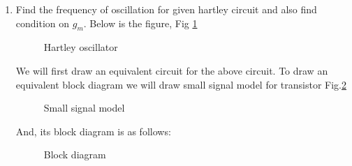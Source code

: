 \begin{enumerate}[label=\arabic*.,ref=\theenumi]
\item Find the frequency of oscillation for given hartley circuit and also find condition on $g_m$.\newline 
Below is the figure, Fig \ref{fig:ee18btech11019_fig1}

\begin{figure}[!ht]
	\begin{center}
		\resizebox{\columnwidth}{!}{}
	\end{center}
\caption{Hartley oscillator}
\label{fig:ee18btech11019_fig1}
\end{figure}
\solution We will first draw an equivalent circuit for the above circuit.\newline
To draw an equivalent block diagram we will draw small signal model for transistor Fig.\ref{fig:ee18btech11019_fig2}\newline
\begin{figure}[!ht]
	\begin{center}
		\resizebox{\columnwidth}{!}{}
	\end{center}
\caption{Small signal model}
\label{fig:ee18btech11019_fig2}
\end{figure}
And, its block diagram is as follows: \newline

\begin{figure}[!ht]
	\begin{center}
		\resizebox{\columnwidth}{!}{}
	\end{center}
\caption{Block diagram}
\label{fig:ee18btech11019_fig3}
\end{figure}


\end{enumerate}

